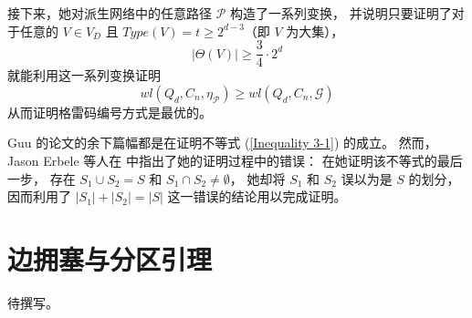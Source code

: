 接下来，她对派生网络中的任意路径 $\mathcal{P}$ 构造了一系列变换，
并说明只要证明了对于任意的 $V \in V_D$ 且 $Type(V) = t \ge 2^{d - 3}$（即 $V$ 为大集），
\begin{equation}
\label{Inequality 3-1}
|\Theta(V)| \ge \frac{3}{4} \cdot 2^d
\end{equation}
就能利用这一系列变换证明
\begin{equation*}
wl(Q_d, C_n, \eta_\mathcal{P}) \ge wl(Q_d, C_n, \mathcal{G})
\end{equation*}
从而证明格雷码编号方式是最优的。

Guu 的论文的余下篇幅都是在证明不等式 (\ref{Inequality 3-1}) 的成立。
然而，Jason Erbele 等人在 \cite{Erbele.2003} 中指出了她的证明过程中的错误：
在她证明该不等式的最后一步，
存在 $S_1 \cup S_2 = S$ 和 $S_1 \cap S_2 \neq \emptyset$，
她却将 $S_1$ 和 $S_2$ 误以为是 $S$ 的划分，
因而利用了 $|S_1| + |S_2| = |S|$ 这一错误的结论用以完成证明。

\section{边拥塞与分区引理}
\label{Section 3.3}

待撰写。
